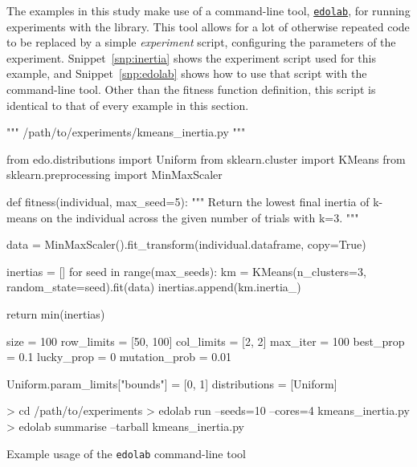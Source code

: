 The examples in this study make use of a command-line tool,
\href{https://github.com/daffidwilde/edolab}{\texttt{edolab}}, for
running experiments with the library. This tool allows for a lot of otherwise
repeated code to be replaced by a simple \emph{experiment} script, configuring
the parameters of the experiment. Snippet~\ref{snp:inertia} shows the experiment
script used for this example, and Snippet~\ref{snp:edolab} shows how to use that
script with the command-line tool. Other than the fitness function definition,
this script is identical to that of every example in this section.

\begin{listing}
\begin{sourcepy}
""" /path/to/experiments/kmeans_inertia.py """

from edo.distributions import Uniform
from sklearn.cluster import KMeans
from sklearn.preprocessing import MinMaxScaler


def fitness(individual, max_seed=5):
    """ Return the lowest final inertia of k-means on the individual
    across the given number of trials with k=3. """

    data = MinMaxScaler().fit_transform(individual.dataframe, copy=True)

    inertias = []
    for seed in range(max_seeds):
        km = KMeans(n_clusters=3, random_state=seed).fit(data)
        inertias.append(km.inertia_)

    return min(inertias)


size = 100
row_limits = [50, 100]
col_limits = [2, 2]
max_iter = 100
best_prop = 0.1
lucky_prop = 0
mutation_prob = 0.01

Uniform.param_limits["bounds"] = [0, 1]
distributions = [Uniform]
\end{sourcepy}
\caption{%
    An abridged version of the experiment configuration script used in the first
    example
}\label{snp:inertia}
\end{listing}

\begin{listing}
\begin{usagesh}
> cd /path/to/experiments
> edolab run --seeds=10 --cores=4 kmeans_inertia.py
> edolab summarise --tarball kmeans_inertia.py
\end{usagesh}
\caption{Example usage of the \texttt{edolab} command-line tool}
\label{snp:edolab}
\end{listing}

